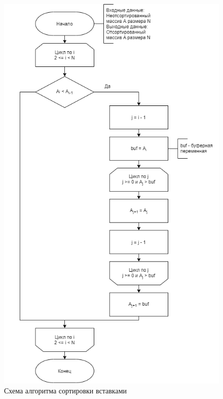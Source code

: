 \newpage 
\begin{figure}[h!]
	\begin{center}
		\includegraphics[scale=0.6]{assets/insertionSort.png}
	\end{center}
	\caption{Схема алгоритма сортировки вставками}
\end{figure}

